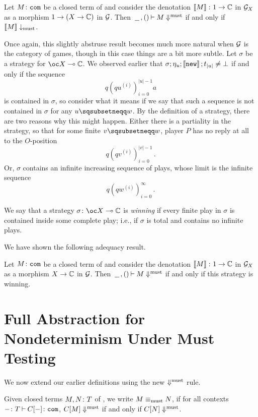 \documentclass[11pt]{report}
\begin{document}
\begin{corollary}
  Let $M\colon {\mathtt{com}}$ be a closed term of \IAX and consider the denotation $\left\llbracket M\right\rrbracket \colon 1 \to \mathbb{C}$ in $\mathcal G_X$ as a morphism $1 \to (X \to \mathbb{C})$ in $\mathcal G$.
  Then $\,\underline{\hspace{1.5ex}}\,,()\mathbin{\vdash} M\Downarrow^{\text{must}}$ if and only if $\left\llbracket M\right\rrbracket\downarrow_{\operatorname{must}}$.
  \label{CorAdeqMust}
\end{corollary}

Once again, this slightly abstruse result becomes much more natural when $\mathcal G$ is the category of games, though in this case things are a bit more subtle.  
Let $\sigma$ be a strategy for $\oc X \implies \bC$.  
We observed earlier that $\sigma;\eta_u;\left\llbracket{\mathtt{new}}\right\rrbracket;t_{|u|}\neq\bot$ if and only if the sequence
\[
  q(qu^{(i)})_{i=0}^{|u|-1} a
  \]
is contained in $\sigma$, so consider what it means if we say that such a sequence is not contained in $\sigma$ for any $u\pprefix w$.  
By the definition of a strategy, there are two reasons why this might happen.  
Either there is a partiality in the strategy, so that for some finite $v\pprefix w$, player $P$ has no reply at all to the $O$-position
\[
  q(qv^{(i)})_{i=0}^{|v|-1}\,.
  \]
Or, $\sigma$ contains an infinite increasing sequence of plays, whose limit is the infinite sequence
\[
  q(qw^{(i)})_{i=0}^\infty\,.
  \]
\begin{definition}
  We say that a strategy $\sigma\from \oc X \implies \bC$ is \emph{winning} if every finite play in $\sigma$ is contained inside some complete play; i.e., if $\sigma$ is total and contains no infinite plays.
\end{definition}

We have shown the following adequacy result.
\begin{corollary}
  Let $M\colon {\mathtt{com}}$ be a closed term of \IAX and consider the denotation $\left\llbracket M\right\rrbracket \colon 1 \to \mathbb{C}$ in $\mathcal G_X$ as a morphism $X \to \mathbb{C}$ in $\mathcal G$.
  Then $\,\underline{\hspace{1.5ex}}\,,()\mathbin{\vdash} M\Downarrow^{\text{must}}$ if and only if this strategy is winning.
\end{corollary}

\section{Full Abstraction for Nondeterminism Under Must Testing}

We now extend our earlier definitions using the new $\Downarrow^{\text{must}}$ rule.

\begin{definition}
  Given closed terms $M,N\colon T$ of \IAX, we write $M\equiv_{\operatorname{must}} N$, if for all contexts $-\colon T\mathbin{\vdash} C[-]\colon{\mathtt{com}}$, $C[M]\Downarrow^{\text{must}}$ if and only if $C[N]\Downarrow^{\text{must}}$.
\end{definition}
\end{document}

